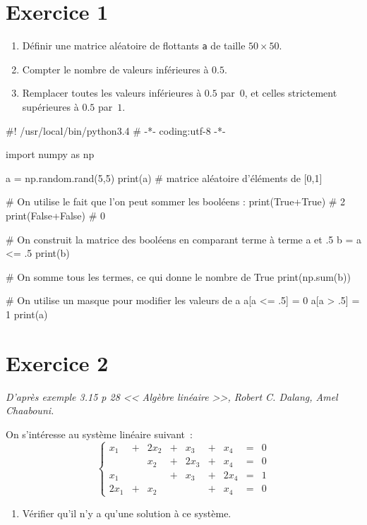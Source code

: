 \documentclass[10pt,fleqn]{article} %
\begin{document}

\vspace{5cm}
\pagestyle{fancy}
\thispagestyle{plain}


\def\columnseprulecolor{\color{ocre}}
\setlength{\columnseprule}{0.4pt} 
\ifprof
\else
\begin{multicols}{2}
\fi

\section*{Exercice 1}%
\begin{enumerate}
\item Définir une matrice aléatoire de flottants \texttt{a} de taille $50\times 50$.

\item Compter le nombre de valeurs inférieures à $0.5$.

\item Remplacer toutes les valeurs inférieures à $0.5$ par~$0$, et celles
  strictement supérieures à $0.5$ par~$1$.
\end{enumerate}
\ifprof 
\begin{corrige}
\begin{python}
#! /usr/local/bin/python3.4
# -*- coding:utf-8 -*-
    
import numpy as np

a = np.random.rand(5,5)
print(a)
# matrice aléatoire d'éléments de [0,1]

# On utilise le fait que l'on peut sommer les booléens : 
print(True+True)
# 2
print(False+False)
# 0

# On construit la matrice des booléens en comparant terme à terme a et .5
b = a <= .5
print(b)

# On somme tous les termes, ce qui donne le nombre de True
print(np.sum(b))

# On utilise un masque pour modifier les valeurs de a
a[a <= .5] = 0
a[a > .5] = 1
print(a)

\end{python}
\end{corrige}
\else
\fi

\section*{Exercice 2}
\textit{D'après exemple 3.15 p 28 << Algèbre linéaire >>, Robert C. Dalang, Amel Chaabouni.}

On s'intéresse au système linéaire suivant~: 
\[
\left\{
  \begin{array}{rcrcrcrcl}
    x_1 & + & 2x_2 & + & x_3 & + & x_4 & = & 0 \\
    & & x_2 & + & 2x_3 & + & x_4 & = & 0 \\
    x_1 & & & + & x_3 & + & 2x_4 & = & 1 \\
    2x_1 & + & x_2 & & & + & x_4 & = & 0 
  \end{array}
\right.
\]
\begin{enumerate}
\item 
  Vérifier qu'il n'y a qu'une solution à ce système.


\end{enumerate}
\end{multicols}
\end{document}
